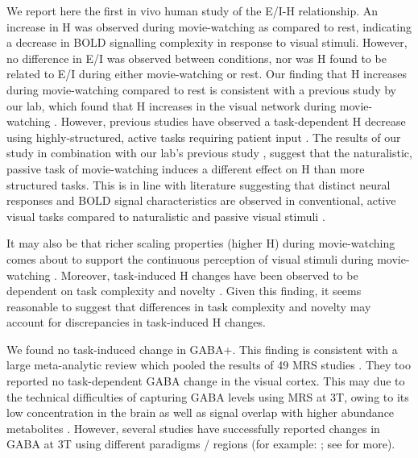 \documentclass[
true
]{sn-jnl}
\begin{document}
We report here the first in vivo human study of the E/I-H relationship.
An increase in H was observed during movie-watching as compared to rest,
indicating a decrease in BOLD signalling complexity in response to
visual stimuli. However, no difference in E/I was observed between
conditions, nor was H found to be related to E/I during either
movie-watching or rest. Our finding that H increases during
movie-watching compared to rest is consistent with a previous study by
our lab, which found that H increases in the visual network during
movie-watching \citep{campbellFractalBasedAnalysisFMRI2022}. However,
previous studies have observed a task-dependent H decrease using
highly-structured, active tasks requiring patient input
\citep{heScaleFreePropertiesFunctional2011, churchillSuppressionScalefreeFMRI2016, ciuciuInterplayFunctionalConnectivity2014, barnesEndogenousHumanBrain2009}.
The results of our study in combination with our lab's previous study
\citep{campbellFractalBasedAnalysisFMRI2022}, suggest that the
naturalistic, passive task of movie-watching induces a different effect
on H than more structured tasks. This is in line with literature
suggesting that distinct neural responses and BOLD signal
characteristics are observed in conventional, active visual tasks
compared to naturalistic and passive visual stimuli
\citep{campbellFractalBasedAnalysisFMRI2022, hassonReliabilityCorticalActivity2010}.

It may also be that richer scaling properties (higher H) during
movie-watching comes about to support the continuous perception of
visual stimuli during movie-watching
\citep{campbellFractalBasedAnalysisFMRI2022}. Moreover, task-induced H
changes have been observed to be dependent on task complexity and
novelty \citep{churchillSuppressionScalefreeFMRI2016}. Given this
finding, it seems reasonable to suggest that differences in task
complexity and novelty may account for discrepancies in task-induced H
changes.

We found no task-induced change in GABA+. This finding is consistent
with a large meta-analytic review which pooled the results of 49 MRS
studies \citep{pasantaFunctionalMRSStudies2023}. They too reported no
task-dependent GABA change in the visual cortex. This may due to the
technical difficulties of capturing GABA levels using MRS at 3T, owing
to its low concentration in the brain as well as signal overlap with
higher abundance metabolites \citep{pasantaFunctionalMRSStudies2023}.
However, several studies have successfully reported changes in GABA at
3T using different paradigms / regions (for example:
\citep{floyer-leaRapidModulationGABA2006, sampaio-baptistaChangesFunctionalConnectivity2015, staggRoleGABAHuman2011};
see \citet{pasantaFunctionalMRSStudies2023} for more).
\end{document}
